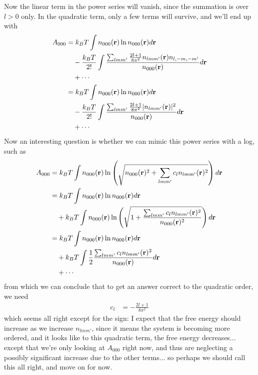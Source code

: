\documentclass[letterpaper,twocolumn,amsmath,amssymb,pre]{revtex4-1}
\begin{document}
Now the linear term in the power series will vanish, since the
summation is over $l>0$ only.  In the quadratic term, only a few terms
will survive, and we'll end up with
\begin{align}
  A_{000}
  &=
  k_BT\int
  n_{000}(\mathbf{r})\ln n_{000}(\mathbf{r})d\mathbf{r}
  \\&\quad-\frac{k_BT}{2!}\int
  \frac{\sum_{lmm'} \frac{2l+1}{8\pi^2} n_{lmm'}(\mathbf{r})n_{l,-m,-m'}}{n_{000}(\mathbf{r})}
  d\mathbf{r}
  \\&\quad+\cdots
  \\
  &=
  k_BT\int
  n_{000}(\mathbf{r})\ln n_{000}(\mathbf{r})d\mathbf{r}
  \\&\quad-\frac{k_BT}{2!}\int
  \frac{\sum_{lmm'} \frac{2l+1}{8\pi^2} |n_{lmm'}(\mathbf{r})|^2}{n_{000}(\mathbf{r})}
  d\mathbf{r}
  \\&\quad+\cdots
\end{align}
Now an interesting question is whether we can mimic this power series
with a log, such as
\begin{align}
  A_{000}
  &=
  k_BT\int
  n_{000}(\mathbf{r})\ln \left( \sqrt{n_{000}(\mathbf{r})^2 + \sum_{lmm'}
    c_ln_{lmm'}(\mathbf{r})^2} \right)d\mathbf{r}
  \\
  &= 
  k_BT\int
  n_{000}(\mathbf{r})\ln n_{000}(\mathbf{r})d\mathbf{r}
  \\&\quad+
  k_BT\int n_{000}(\mathbf{r})\ln\left( \sqrt{1 + \frac{\sum_{lmm'}
    c_ln_{lmm'}(\mathbf{r})^2}{n_{000}(\mathbf{r})^2}} \right)d\mathbf{r}
  \\
  &=
  k_BT\int
  n_{000}(\mathbf{r})\ln n_{000}(\mathbf{r})d\mathbf{r}
  \\&\quad+
  k_BT\int \frac12 \frac{\sum_{lmm'}
    c_ln_{lmm'}(\mathbf{r})^2}{n_{000}(\mathbf{r})} d\mathbf{r}
  \\&\quad+\cdots
\end{align}
from which we can conclude that to get an answer correct to the
quadratic order, we need
\begin{align}
  c_l &= -\frac{2l+1}{8\pi^2}
\end{align}
which seems all right except for the sign:  I expect that the free
energy should increase as we increase $n_{lmm'}$, since it means the
system is becoming more ordered, and it looks like to this quadratic
term, the free energy decreases... except that we're only looking at
$A_{000}$ right now, and thus are neglecting a possibly significant
increase due to the other terms...  so perhaps we should call this all
right, and move on for now.
\end{document}
